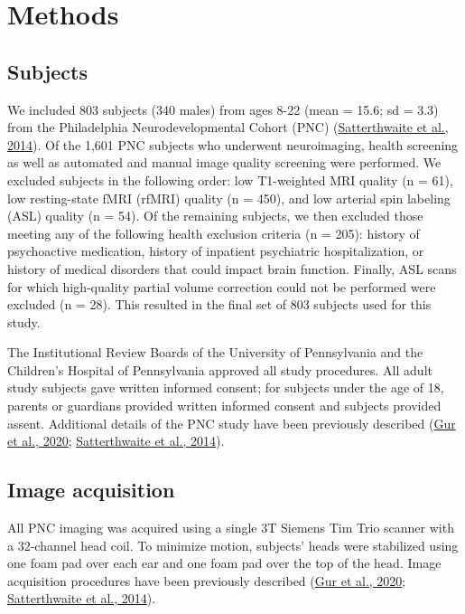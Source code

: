 \documentclass[
  12pt,
]{article}
\begin{document}
\hypertarget{methods}{%
\section{Methods}\label{methods}}

\hypertarget{subjects}{%
\subsection{Subjects}\label{subjects}}

We included 803 subjects (340 males) from ages 8-22 (mean = 15.6; sd = 3.3) from the Philadelphia Neurodevelopmental Cohort (PNC) (\protect\hyperlink{ref-satterthwaite_neuroimaging_2014}{Satterthwaite et al., 2014}). Of the 1,601 PNC subjects who underwent neuroimaging, health screening as well as automated and manual image quality screening were performed. We excluded subjects in the following order: low T1-weighted MRI quality (n = 61), low resting-state fMRI (rfMRI) quality (n = 450), and low arterial spin labeling (ASL) quality (n = 54). Of the remaining subjects, we then excluded those meeting any of the following health exclusion criteria (n = 205): history of psychoactive medication, history of inpatient psychiatric hospitalization, or history of medical disorders that could impact brain function. Finally, ASL scans for which high-quality partial volume correction could not be performed were excluded (n = 28). This resulted in the final set of 803 subjects used for this study.

The Institutional Review Boards of the University of Pennsylvania and the Children's Hospital of Pennsylvania approved all study procedures. All adult study subjects gave written informed consent; for subjects under the age of 18, parents or guardians provided written informed consent and subjects provided assent. Additional details of the PNC study have been previously described (\protect\hyperlink{ref-gurStructuralFunctionalBrain2020}{Gur et al., 2020}; \protect\hyperlink{ref-satterthwaite_neuroimaging_2014}{Satterthwaite et al., 2014}).

\hypertarget{image-acquisition}{%
\subsection{Image acquisition}\label{image-acquisition}}

All PNC imaging was acquired using a single 3T Siemens Tim Trio scanner with a 32-channel head coil. To minimize motion, subjects' heads were stabilized using one foam pad over each ear and one foam pad over the top of the head. Image acquisition procedures have been previously described (\protect\hyperlink{ref-gurStructuralFunctionalBrain2020}{Gur et al., 2020}; \protect\hyperlink{ref-satterthwaite_neuroimaging_2014}{Satterthwaite et al., 2014}).
\end{document}

